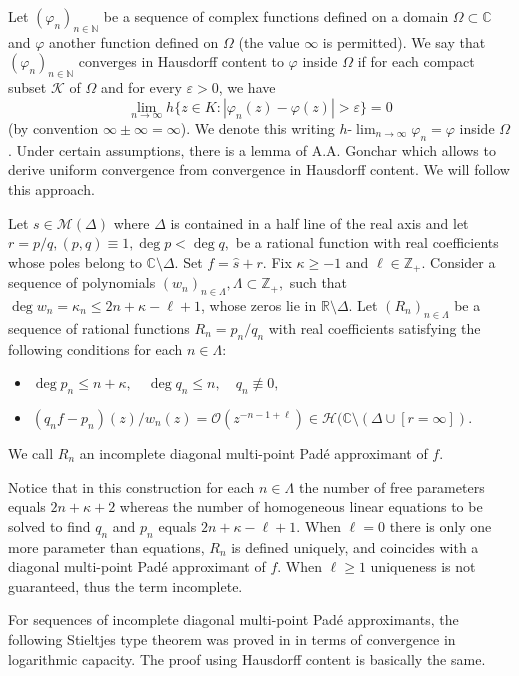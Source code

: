 \documentclass[10pt,a4paper]{article}
\theoremstyle{definition}
\theoremstyle{remark}
\numberwithin{equation}{section}
\begin{document}
Let $(\varphi_n)_{n\in\mathbb{N}}$ be a sequence of complex functions
defined on a domain $\Omega \subset\mathbb{C}$ and $\varphi$ another
function defined on $\Omega$ (the value $\infty$ is permitted). We say that
$(\varphi_n)_{n\in\mathbb{N}}$ converges in Hausdorff content to
$\varphi$ inside $\Omega$ if for each compact
subset $\mathcal{K}$ of $\Omega$ and for every $\varepsilon
>0$, we have
$$
\lim_{n\to\infty} h\{z\in K :
|\varphi_n(z)-\varphi(z)|>\varepsilon\}=0
$$
(by convention $\infty \pm \infty = \infty$). We denote this writing $h$-$\lim_{n\to \infty} \varphi_n =
\varphi$ inside $\Omega$. Under certain assumptions, there is a lemma of A.A. Gonchar \cite[Lemma 1]{Gon} which allows to derive uniform convergence from convergence in Hausdorff content. We will follow this approach.


Let $s \in \mathcal{M}(\Delta)$ where $\Delta$ is contained in a half line of the real axis and let $r=p/q, (p,q) \equiv 1, \deg p < \deg q,$ be a rational function with real coefficients whose poles belong to $\mathbb{C} \setminus \Delta$. Set $f = \widehat{s} +r$. Fix $\kappa \geq -1$ and $\ell \in \mathbb{Z}_+$. Consider a sequence of polynomials $(w_n)_{n \in \Lambda},  \Lambda \subset \mathbb{Z}_+,$ such that $\deg w_n = \kappa_n \leq 2n + \kappa - \ell +1$, whose zeros lie in $\mathbb{R} \setminus \Delta$. Let $(R_n)_{n \in \Lambda}$ be a sequence of rational functions $R_n = p_n/q_n$ with real coefficients satisfying the following conditions for each $n \in \Lambda$:
\begin{itemize}
\item[a)] $\deg p_n \leq n + \kappa,\quad  \deg q_n \leq n, \quad q_n \not\equiv 0,$
\item[b)] $ {(q_n f - p_n)(z)}/{w_n}(z) = \mathcal{O}\left( {z^{-n-1 + \ell}}\right) \in \mathcal{H}(\mathbb{C}\setminus (\Delta \cup [r=\infty]) $.
\end{itemize}
We call $R_n$ an incomplete diagonal multi-point Pad\'e approximant of $f$.

Notice that in this construction for each $n \in \Lambda$ the number of free parameters equals $2n + \kappa +2$ whereas the number of homogeneous linear equations to be solved  to find $q_n$ and $p_n$ equals $2n + \kappa - \ell + 1$. When $\ell =0$ there is only one more parameter than equations, $R_n$ is defined uniquely, and coincides with a diagonal multi-point Pad\'e approximant of $f$. When $\ell \geq 1$ uniqueness is not guaranteed, thus the term incomplete.

For sequences of incomplete diagonal multi-point Pad\'e approximants, the following Stieltjes type theorem was proved in \cite[Lemma 2]{Bus} in terms of convergence in logarithmic capacity. The proof using Hausdorff content is basically the same.
\end{document}
